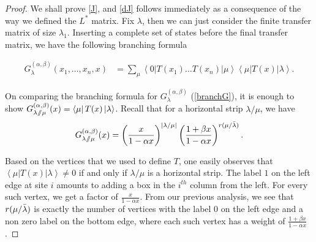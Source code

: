 \documentclass[11pt]{article}
\newcommand{\sslash}{\mathbin{/\mkern-6mu/}}
\newcommand{\bra}[1]{\left\langle #1\right|}
\newcommand{\ket}[1]{\left|#1\right\rangle}
\newcommand\Gg{{G^{(\alpha,\beta)}_{\lambda}}}
\begin{document}
\begin{proof}
We shall prove \eqref{J}, and \eqref{dJ} follows immediately as a consequence of the way we defined the $L^{*}$ matrix. Fix $\lambda$, then we can just consider the finite transfer matrix of size $\lambda_1$. Inserting a complete set of states before the final transfer matrix, we have the following branching formula

\begin{align*}
    \Gg(x_1,\dots,x_n,x)
&=
\sum_{\mu}
\bra{0}
T(x_1)
\dots
T(x_n)
\ket{\mu}
\bra{\mu}
T(x)
\ket{\lambda}.
\end{align*}

On comparing the branching formula for $\Gg$ (\cref{branchG}), it is enough to show $G^{(\alpha,\beta)}_{\lambda\sslash\mu}(x)=\bra{\mu}T(x)\ket{\lambda}$.
Recall that for a horizontal strip $\lambda/\mu$, we have
\begin{align*}
G^{(\alpha,\beta)}_{\lambda\sslash\mu}(x)= 
\left(
\frac{x}{1-\alpha x}
\right)^{|\lambda/\mu|}
\left(
\frac{1+\beta x}{1-\alpha x}
\right)^{r(\mu/\Bar{\lambda})}.
\end{align*}

Based on the vertices that we used to define $T$, one easily observes that $\bra{\mu}T(x) \ket{\lambda}\neq 0$ if and only if $\lambda/\mu$ is a horizontal strip. The label $1$ on the left edge at site $i$ amounts to adding a box in the $i^{th}$ column from the left. For every such vertex, we get a factor of $\frac{x}{1-\alpha x}$. From our previous analysis, we see that $r(\mu/\Bar{\lambda})$ is exactly the number of vertices with the label $0$ on the left edge and a non zero label on the bottom edge, where each such vertex has a weight of $\frac{1+\beta x}{1-\alpha x}$.
\end{proof}
\end{document}
